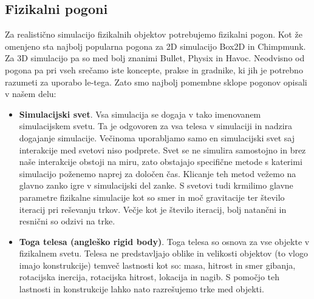 \documentclass[12pt,a4paper,twoside]{book}
\begin{document}
\subsection{Fizikalni pogoni}
Za realistično simulacijo fizikalnih objektov potrebujemo fizikalni pogon. Kot že omenjeno sta najbolj popularna pogona za 2D simulacijo Box2D in Chimpmunk. Za 3D simulacijo pa so med bolj znanimi Bullet, Physix in Havoc. Neodvisno od pogona pa pri vseh srečamo iste koncepte, prakse in gradnike, ki jih je potrebno razumeti za uporabo le-tega. Zato smo najbolj pomembne sklope pogonov opisali v našem delu:
\begin{itemize}
	\item \textbf{Simulacijski svet}.  Vsa simulacija se dogaja v tako imenovanem simulacijskem svetu. Ta je odgovoren za vsa telesa v simulaciji in nadzira dogajanje simulacije. Večinoma uporabljamo samo en simulacijski svet saj interakcije med svetovi niso podprete. Svet se ne simulira samostojno in brez naše interakcije obstoji na miru, zato obstajajo specifične metode s katerimi simulacijo poženemo naprej za določen čas. Klicanje teh metod vežemo na glavno zanko igre v simulacijski del zanke. S svetovi tudi krmilimo glavne parametre fizikalne simulacije kot so smer in moč gravitacije ter število iteracij pri reševanju trkov. Večje kot je število iteracij, bolj natančni in resnični so odzivi na trke.
	\item \textbf{Toga telesa (angleško rigid body)}. Toga telesa so osnova za vse objekte v fizikalnem svetu. Telesa ne predstavljajo oblike in velikosti objektov (to vlogo imajo konstrukcije) temveč lastnosti kot so: masa, hitrost  in smer gibanja, rotacijska inercija, rotacijska hitrost, lokacija in nagib. S pomočjo teh lastnosti in konstrukcije lahko nato razrešujemo trke med objekti.
	

\end{itemize}
\end{document}
